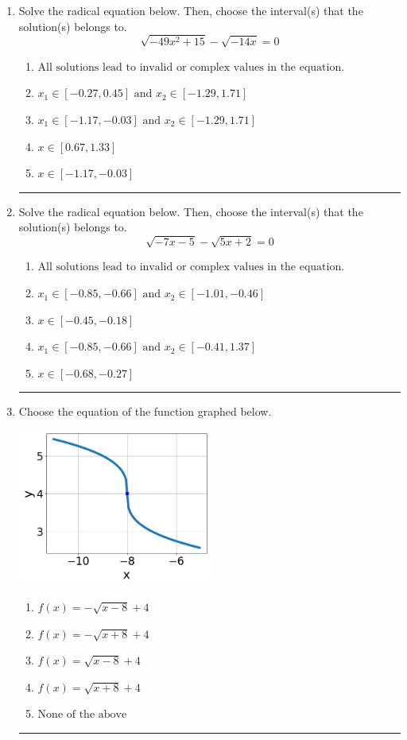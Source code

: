 \documentclass[14pt]{extbook}
\newcommand{\litem}[1]{\item#1\hspace*{-1cm}\rule{\textwidth}{0.4pt}}
\begin{document}
\begin{enumerate}
\litem{
Solve the radical equation below. Then, choose the interval(s) that the solution(s) belongs to.\[ \sqrt{-49 x^2 + 15} - \sqrt{-14 x} = 0 \]\begin{enumerate}[label=\Alph*.]
\item \( \text{All solutions lead to invalid or complex values in the equation.} \)
\item \( x_1 \in [-0.27, 0.45] \text{ and } x_2 \in [-1.29,1.71] \)
\item \( x_1 \in [-1.17, -0.03] \text{ and } x_2 \in [-1.29,1.71] \)
\item \( x \in [0.67,1.33] \)
\item \( x \in [-1.17,-0.03] \)

\end{enumerate} }
\litem{
Solve the radical equation below. Then, choose the interval(s) that the solution(s) belongs to.\[ \sqrt{-7 x - 5} - \sqrt{5 x + 2} = 0 \]\begin{enumerate}[label=\Alph*.]
\item \( \text{All solutions lead to invalid or complex values in the equation.} \)
\item \( x_1 \in [-0.85, -0.66] \text{ and } x_2 \in [-1.01,-0.46] \)
\item \( x \in [-0.45,-0.18] \)
\item \( x_1 \in [-0.85, -0.66] \text{ and } x_2 \in [-0.41,1.37] \)
\item \( x \in [-0.68,-0.27] \)

\end{enumerate} }
\litem{
Choose the equation of the function graphed below.
\begin{center}
    \includegraphics[width=0.5\textwidth]{../Figures/radicalGraphToEquationA.png}
\end{center}
\begin{enumerate}[label=\Alph*.]
\item \( f(x) = - \sqrt{x - 8} + 4 \)
\item \( f(x) = - \sqrt{x + 8} + 4 \)
\item \( f(x) = \sqrt{x - 8} + 4 \)
\item \( f(x) = \sqrt{x + 8} + 4 \)
\item \( \text{None of the above} \)


\end{enumerate}}
\end{enumerate}
\end{document}

